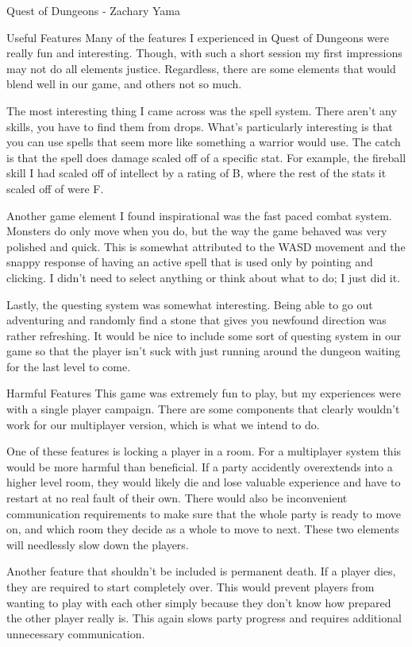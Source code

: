 \documentclass[12pt]{report}
\begin{document}
\begin{section}{Quest of Dungeons - Zachary Yama}
\begin{subsection}{Useful Features}
Many of the features I experienced in Quest of Dungeons were really fun and
interesting. Though, with such a short session my first impressions may not
do all elements justice. Regardless, there are some elements that would
blend well in our game, and others not so much.
 
The most interesting thing I came across was the spell system. There aren’t
any skills, you have to find them from drops. What’s particularly
interesting is that you can use spells that seem more like something a
warrior would use. The catch is that the spell does damage scaled off of a
specific stat. For example, the fireball skill I had scaled off of
intellect by a rating of B, where the rest of the stats it scaled off of
were F.
 
Another game element I found inspirational was the fast paced combat
system. Monsters do only move when you do, but the way the game behaved was
very polished and quick. This is somewhat attributed to the WASD movement
and the snappy response of having an active spell that is used only by
pointing and clicking. I didn’t need to select anything or think about what
to do; I just did it.

Lastly, the questing system was somewhat interesting. Being able to go out
adventuring and randomly find a stone that gives you newfound direction was
rather refreshing. It would be nice to include some sort of questing system
in our game so that the player isn’t suck with just running around the
dungeon waiting for the last level to come.  
\end{subsection}
 
\begin{subsection}{Harmful Features}
This game was extremely fun to play, but my experiences were with a single player campaign. There are 
some components that clearly wouldn’t work for our multiplayer version, which is what we intend to do.
 
One of these features is locking a player in a room. For a multiplayer system this would be more harmful 
than beneficial. If a party accidently overextends into a higher level room, they would likely die and 
lose valuable experience and have to restart at no real fault of their own. There would also be 
inconvenient communication requirements to make sure that the whole party is ready to move on, 
and which room they decide as a whole to move to next. These two elements will needlessly slow down 
the players.
 
Another feature that shouldn’t be included is permanent death. If a player dies, they are required to 
start completely over. This would prevent players from wanting to play with each other simply because 
they don’t know how prepared the other player really is. This again slows party progress and requires 
additional unnecessary communication.
 
\end{subsection}
\end{section}
\end{document}
